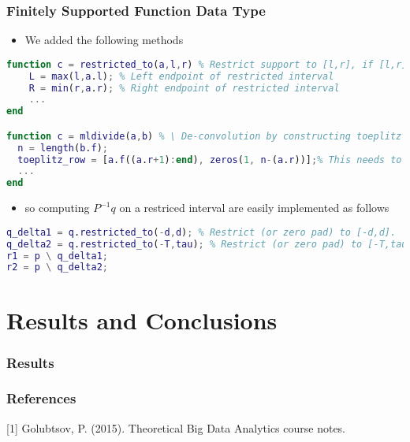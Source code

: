 \documentclass[t]{beamer}
\begin{document}
\begin{frame}[fragile]
\frametitle{ Finitely Supported Function Data Type }
\begin{itemize}
  \item We added the following methods
\end{itemize}
% 
\begin{lstlisting}[language=Matlab,basicstyle=\tiny]
function c = restricted_to(a,l,r) % Restrict support to [l,r], if [l,r] is bigger than [a.l,a.r], then pad with zeroes.
    L = max(l,a.l);	% Left endpoint of restricted interval 
    R = min(r,a.r);	% Right endpoint of restricted interval 
    ...
end

function c = mldivide(a,b) % \ De-convolution by constructing toeplitz matrix. a must be symmetric 
  n = length(b.f);
  toeplitz_row = [a.f((a.r+1):end), zeros(1, n-(a.r))];% This needs to be from the center of p and padded with zeros
  ...
end
\end{lstlisting}
\begin{itemize}
\item so computing $P^{-1}q$ on a restriced interval are easily implemented as follows
\end{itemize}
\begin{lstlisting}[language=Matlab,basicstyle=\tiny]
q_delta1 = q.restricted_to(-d,d); % Restrict (or zero pad) to [-d,d].
q_delta2 = q.restricted_to(-T,tau); % Restrict (or zero pad) to [-T,tau].
r1 = p \ q_delta1; 
r2 = p \ q_delta2; 
\end{lstlisting}
\end{frame}
\section{Results and Conclusions}
\begin{frame}
\end{frame}
\frametitle{ Results }
\begin{frame}
\frametitle{References}

[1] Golubtsov, P. (2015). Theoretical Big Data Analytics course notes.

\end{frame}
\end{document}

